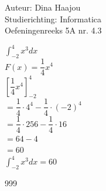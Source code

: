 \documentclass[a4paper]{article}
\begin{document}
\normalsize

\noindent \large Auteur: Dina Haajou \\
\noindent \large Studierichting: Informatica \\
\noindent \large Oefeningenreeks 5A nr. 4.3 \\

\medskip

\normalsize

$\displaystyle \int_{-2}^{4} x^3 dx$ \\

$F(x) = \dfrac{1}{4}x^4$ \\

$\left[ \dfrac{1}{4}x^4 \right]_{-2}^{4}$ \\

$= \dfrac{1}{4} \cdot 4^4 - \dfrac{1}{4} \cdot (-2)^4$ \\

$= \dfrac{1}{4} \cdot 256 - \dfrac{1}{4} \cdot 16$ \\

$= 64 - 4$ \\

$= 60$ \\

$\displaystyle \int_{-2}^{4} x^3 dx = 60$ \\

\begin{thebibliography}{999}
\end{thebibliography}
\end{document}
